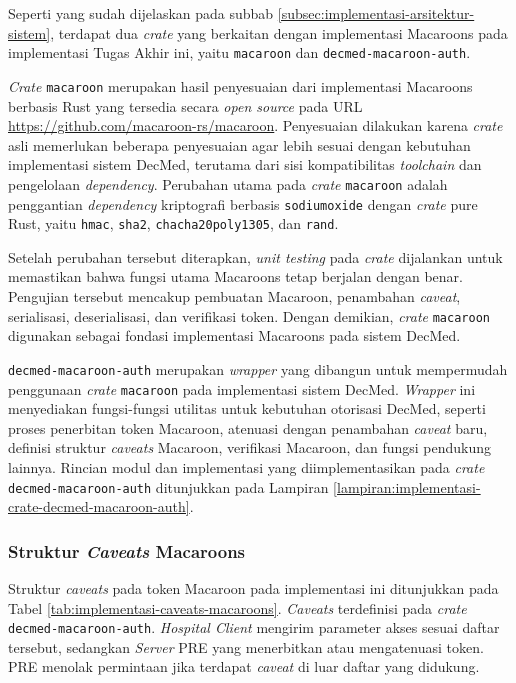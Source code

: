 \documentclass[bahasa, 12pt, a4paper, onecolumn, oneside, final]{report}
\begin{document}
Seperti yang sudah dijelaskan pada subbab \ref{subsec:implementasi-arsitektur-sistem}, terdapat dua \textit{crate} yang berkaitan dengan implementasi Macaroons pada implementasi Tugas Akhir ini, yaitu \texttt{macaroon} dan \texttt{decmed-macaroon-auth}.

\textit{Crate} \texttt{macaroon} merupakan hasil penyesuaian dari implementasi Macaroons berbasis Rust yang tersedia secara \textit{open source} pada URL \url{https://github.com/macaroon-rs/macaroon}. Penyesuaian dilakukan karena \textit{crate} asli memerlukan beberapa penyesuaian agar lebih sesuai dengan kebutuhan implementasi sistem DecMed, terutama dari sisi kompatibilitas \textit{toolchain} dan pengelolaan \textit{dependency}. Perubahan utama pada \textit{crate} \texttt{macaroon} adalah penggantian \textit{dependency} kriptografi berbasis \texttt{sodiumoxide} dengan \textit{crate} pure Rust, yaitu \texttt{hmac}, \texttt{sha2}, \texttt{chacha20poly1305}, dan \texttt{rand}.

Setelah perubahan tersebut diterapkan, \textit{unit testing} pada \textit{crate} dijalankan untuk memastikan bahwa fungsi utama Macaroons tetap berjalan dengan benar. Pengujian tersebut mencakup pembuatan Macaroon, penambahan \textit{caveat}, serialisasi, deserialisasi, dan verifikasi token. Dengan demikian, \textit{crate} \texttt{macaroon} digunakan sebagai fondasi implementasi Macaroons pada sistem DecMed.

\texttt{decmed-macaroon-auth} merupakan \textit{wrapper} yang dibangun untuk mempermudah penggunaan \textit{crate} \texttt{macaroon} pada implementasi sistem DecMed. \textit{Wrapper} ini menyediakan fungsi-fungsi utilitas untuk kebutuhan otorisasi DecMed, seperti proses penerbitan token Macaroon, atenuasi dengan penambahan \textit{caveat} baru, definisi struktur \textit{caveats} Macaroon, verifikasi Macaroon, dan fungsi pendukung lainnya. Rincian modul dan implementasi yang diimplementasikan pada \textit{crate} \texttt{decmed-macaroon-auth} ditunjukkan pada Lampiran \ref{lampiran:implementasi-crate-decmed-macaroon-auth}.

\subsubsection{Struktur \textit{Caveats} Macaroons}
\label{subsubsec:struktur-caveats-macaroons}

Struktur \textit{caveats} pada token Macaroon pada implementasi ini ditunjukkan pada Tabel \ref{tab:implementasi-caveats-macaroons}. \textit{Caveats} terdefinisi pada \textit{crate} \texttt{decmed-macaroon-auth}. \textit{Hospital Client} mengirim parameter akses sesuai daftar tersebut, sedangkan \textit{Server} PRE yang menerbitkan atau mengatenuasi token. PRE menolak permintaan jika terdapat \textit{caveat} di luar daftar yang didukung.
\end{document}
